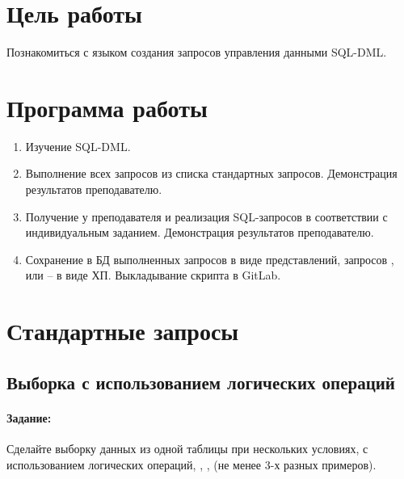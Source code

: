 





\tableofcontents
\newpage

\section{Цель работы}

Познакомиться с языком создания запросов управления данными SQL-DML.

\section{Программа работы}

\begin{enumerate}
	\item Изучение SQL-DML.
	\item Выполнение всех запросов из списка стандартных запросов. Демонстрация результатов преподавателю.
	\item Получение у преподавателя и реализация SQL-запросов в соответствии с индивидуальным заданием. Демонстрация результатов преподавателю.
	\item Сохранение в БД выполненных запросов  в виде представлений, запросов ,  или  -- в виде ХП. Выкладывание скрипта в GitLab.
\end{enumerate}

\section{Стандартные запросы}



\subsection{Выборка с использованием логических операций}

\paragraph{Задание:} Сделайте выборку данных из одной таблицы при нескольких условиях, с использованием логических операций, , ,  (не менее 3-х разных примеров).

